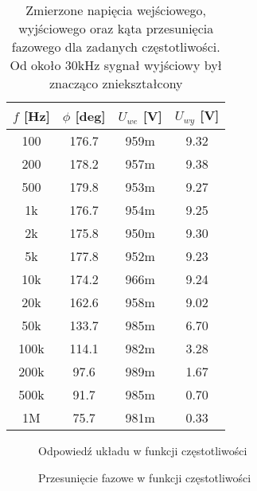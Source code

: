 \begin{table}[H]
	\centering
	\begin{tabular}{c|c|c|c}
		\hline
		\(f\) [Hz] & \(\phi\) [deg] & \(U_{we}\) [V] & \(U_{wy}\) [V]
		\\ \hline\hline
		100		& 176.7	& 959m	& 9.32		\\ \hline
		200		& 178.2	& 957m	& 9.38		\\ \hline
		500		& 179.8	& 953m	& 9.27		\\ \hline
        1k		& 176.7	& 954m	& 9.25		\\ \hline
        2k		& 175.8	& 950m	& 9.30		\\ \hline
        5k		& 177.8	& 952m	& 9.23		\\ \hline
        10k		& 174.2	& 966m	& 9.24		\\ \hline
        20k		& 162.6	& 958m	& 9.02		\\ \hline
        50k		& 133.7	& 985m	& 6.70		\\ \hline
        100k    & 114.1	& 982m	& 3.28		\\ \hline
        200k    & 97.6	& 989m	& 1.67  	\\ \hline
        500k    & 91.7	& 985m	& 0.70  	\\ \hline
        1M      & 75.7	& 981m	& 0.33  	\\ \hline
	\end{tabular}
	\caption{Zmierzone napięcia wejściowego, wyjściowego oraz kąta przesunięcia fazowego dla zadanych częstotliwości.
    Od około 30kHz sygnał wyjściowy był znacząco zniekształcony}
\end{table}

\begin{figure}[H]
    \centering
    
    \caption{Odpowiedź układu w funkcji częstotliwości}
\end{figure}

\begin{figure}[H]
    \centering
    
    \caption{Przesunięcie fazowe w funkcji częstotliwości}
\end{figure}